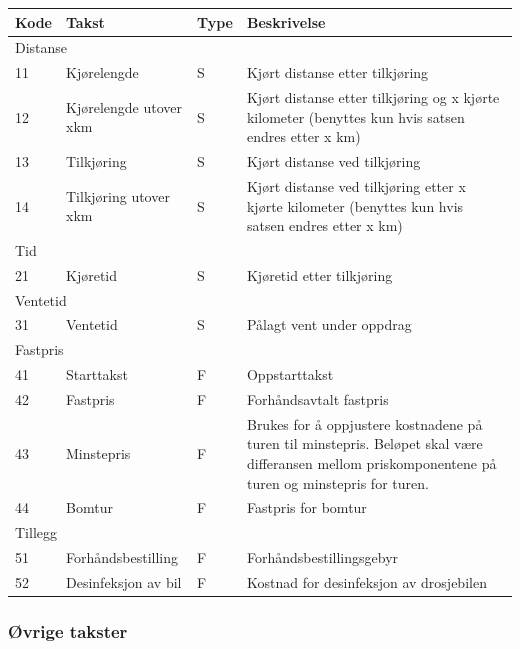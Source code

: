 \documentclass[a4paper,titlepage,norsk,11pt]{article}
\begin{document}
\begin{tabularx}{\textwidth}{|l|l|l|X|}
\hline
\textbf{Kode} & \textbf{Takst} & \textbf{Type} & \textbf{Beskrivelse} \\\hline
\multicolumn{4}{|l|}{Distanse} \\\hline
11 & Kjørelengde & S & Kjørt distanse etter tilkjøring \\\hline
12 & Kjørelengde utover x\footnotemark[1] km & S & Kjørt distanse etter tilkjøring og x kjørte kilometer (benyttes kun hvis satsen endres etter x km) \\\hline
13 & Tilkjøring & S & Kjørt distanse ved tilkjøring \\\hline
14 & Tilkjøring utover x\footnotemark[1] km & S & Kjørt distanse ved tilkjøring etter x kjørte kilometer (benyttes kun hvis satsen endres etter x km) \\\hline
\multicolumn{4}{|l|}{Tid} \\\hline
21 & Kjøretid & S & Kjøretid etter tilkjøring \\\hline
\multicolumn{4}{|l|}{Ventetid} \\\hline
31 & Ventetid & S & Pålagt vent under oppdrag \\\hline
\multicolumn{4}{|l|}{Fastpris} \\\hline
41 & Starttakst & F & Oppstarttakst \\\hline
42 & Fastpris & F & Forhåndsavtalt fastpris \\\hline
43 & Minstepris & F & Brukes for å oppjustere kostnadene på turen til minstepris. Beløpet skal være differansen mellom priskomponentene på turen og minstepris for turen. \\\hline
44 & Bomtur & F & Fastpris for bomtur \\\hline
\multicolumn{4}{|l|}{Tillegg} \\\hline
51 & Forhåndsbestilling & F & Forhåndsbestillingsgebyr \\\hline
52 & Desinfeksjon av bil & F & Kostnad for desinfeksjon av drosjebilen \\\hline
\end{tabularx}


\subsubsection{Øvrige takster}
\end{document}
